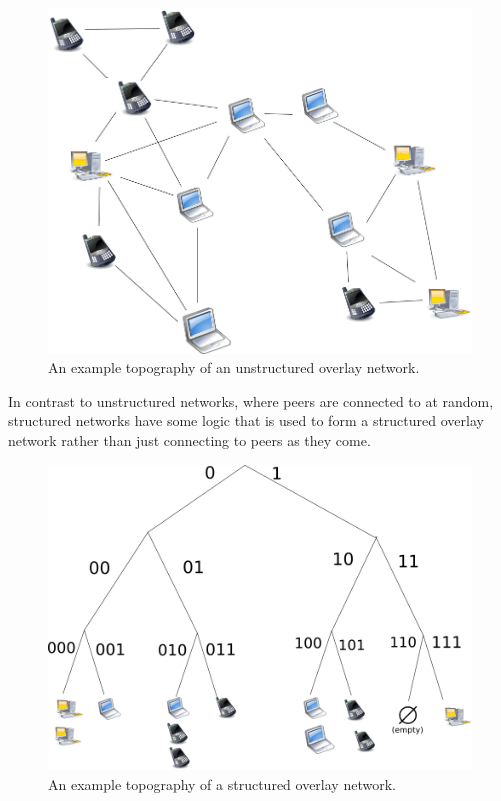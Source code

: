 \begin{figure}
	\includegraphics[width=\textwidth]{pictures/unstructured.png}
	\caption{An example topography of an unstructured overlay network.}
	\label{Unstructured Overlay Network}
\end{figure}

In contrast to unstructured networks, where peers are connected to at random, structured networks have some logic that is used to form a structured overlay network rather than just connecting to peers as they come.

\begin{figure}
	\includegraphics[width=\textwidth]{pictures/structured.png}
	\caption{An example topography of a structured overlay network.}
	\label{Structured Overlay Network}
\end{figure}

